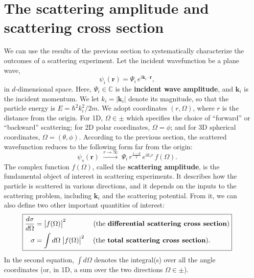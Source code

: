 \documentclass[pra,12pt]{revtex4}
\begin{document}
\section{The scattering amplitude and scattering cross section}

We can use the results of the previous section to systematically
characterize the outcomes of a scattering experiment.  Let the
incident wavefunction be a plane wave,
$$\psi_i(\mathbf{r}) = \Psi_i \, e^{i\mathbf{k}_i\cdot\mathbf{r}},$$
in $d$-dimensional space.  Here, $\Psi_i \in \mathbb{C}$ is the
\textbf{incident wave amplitude}, and $\mathbf{k}_i$ is the incident
momentum.  We let $k_i = |\mathbf{k}_i|$ denote its magnitude, so that
the particle energy is $E = \hbar^2k_i^2/2m$.  We adopt coordinates
$(r,\Omega)$, where $r$ is the distance from the origin.  For 1D,
$\Omega \in \pm$ which specifies the choice of ``forward'' or
``backward'' scattering; for 2D polar coordinates, $\Omega = \phi$;
and for 3D spherical coordinates, $\Omega = (\theta,\phi)$.  According
to the previous section, the scattered wavefunction reduces to the
following form far from the origin:
$$\psi_s(\mathbf{r})\;  \overset{r\rightarrow\infty}{\longrightarrow}\; \Psi_i \, r^{\frac{1-d}{2}} \, e^{ik_ir} \, f(\Omega).$$
The complex function $f(\Omega)$, called the \textbf{scattering
  amplitude}, is the fundamental object of interest in scattering
experiments.  It describes how the particle is scattered in various
directions, and it depends on the inputs to the scattering problem,
including $\mathbf{k}_i$ and the scattering potential.  From it, we
can also define two other important quantities of interest:
$$\boxed{\begin{aligned}\frac{d\sigma}{d\Omega} &= \big|f(\Omega)\big|^2 \qquad\quad\quad \text{(the \textbf{differential scattering cross section})} \\ \sigma &= \int d\Omega\; \big|f(\Omega)\big|^2 \quad\; \text{(the \textbf{total scattering cross section}).}
  \end{aligned}}$$
In the second equation, $\int d\Omega$ denotes the integral(s) over
all the angle coordinates (or, in 1D, a sum over the two directions
$\Omega \in \pm$).
\end{document}
